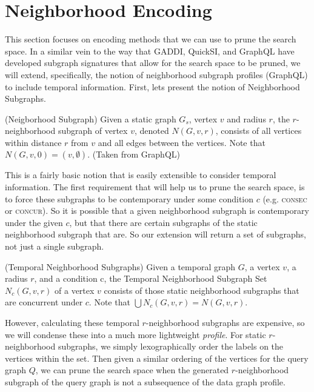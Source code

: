 \section{Neighborhood Encoding}

This section focuses on encoding methods that we can use to prune the search
space. In a similar vein to the way that GADDI, QuickSI, and GraphQL have
developed subgraph signatures that allow for the search space to be pruned, we
will extend, specifically, the notion of neighborhood subgraph profiles
(GraphQL) to include temporal information. First, lets present the notion of
Neighborhood Subgraphs.

\begin{defn}
  (Neigborhood Subgraph) Given a static graph $G_s$, vertex $v$ and radius $r$,
  the $r$-neighborhood subgraph of vertex $v$, denoted $N(G,v,r)$, consists of
  all vertices within distance $r$ from $v$ and all edges between the
  vertices. Note that $N(G,v,0) = ({v}, \emptyset)$. (Taken from GraphQL)
\end{defn}

This is a fairly basic notion that is easily extensible to consider temporal
information. The first requirement that will help us to prune the search space,
is to force these subgraphs to be contemporary under some condition $c$
(e.g. \textsc{consec} or \textsc{concur}). So it is possible that a given
neighborhood subgraph is contemporary under the given $c$, but that there are
certain subgraphs of the static neighborhood subgraph that are.  So our
extension will return a set of subgraphs, not just a single subgraph.

\begin{defn}
  (Temporal Neighborhood Subgraphs) Given a temporal graph $G$, a vertex $v$, a
  radius $r$, and a condition c, the Temporal Neighborhood Subgraph Set
  $N_c(G,v,r)$ of a vertex $v$ consists of those static neighborhood subgraphs
  that are concurrent under $c$. Note that $\displaystyle\bigcup N_c(G,v,r) =
  N(G,v,r)$.
\end{defn}

However, calculating these temporal $r$-neighborhood subgraphs are expensive, so we
will condense these into a much more lightweight \textit{profile}. For static
$r$-neighborhood subgraphs, we simply lexographically order the labels on the
vertices within the set. Then given a similar ordering of the vertices for the
query graph $Q$, we can prune the search space when the generated $r$-neighborhood
subgraph of the query graph is not a subsequence of the data graph profile.

